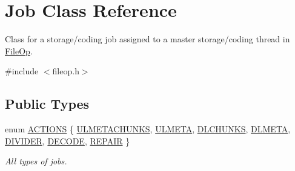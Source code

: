 \hypertarget{classJob}{\section{\-Job \-Class \-Reference}
\label{classJob}
}


\-Class for a storage/coding job assigned to a master storage/coding thread in \hyperlink{classFileOp}{\-File\-Op}.  




{\ttfamily \#include $<$fileop.\-h$>$}

\subsection*{\-Public \-Types}
\begin{DoxyCompactItemize}
\item 
enum \hyperlink{classJob_a639625a71786e5ebaee5697a4fdb6dd0}{\-A\-C\-T\-I\-O\-N\-S} \{ \*
\hyperlink{classJob_a639625a71786e5ebaee5697a4fdb6dd0a88681b55283b6d6a18dab547a5a0157e}{\-U\-L\-M\-E\-T\-A\-C\-H\-U\-N\-K\-S}, 
\hyperlink{classJob_a639625a71786e5ebaee5697a4fdb6dd0aca189975ee24cea325469a6afbd61cc7}{\-U\-L\-M\-E\-T\-A}, 
\hyperlink{classJob_a639625a71786e5ebaee5697a4fdb6dd0a7dc38d7c314a0751c433d1c4c7c0da7c}{\-D\-L\-C\-H\-U\-N\-K\-S}, 
\hyperlink{classJob_a639625a71786e5ebaee5697a4fdb6dd0a7da1798dfa76789736879d8f0edb668c}{\-D\-L\-M\-E\-T\-A}, 
\*
\hyperlink{classJob_a639625a71786e5ebaee5697a4fdb6dd0aa2a3b77b77684cff94f531cd16bce014}{\-D\-I\-V\-I\-D\-E\-R}, 
\hyperlink{classJob_a639625a71786e5ebaee5697a4fdb6dd0a5fa4d14da7528a295d2ed84cb17862a5}{\-D\-E\-C\-O\-D\-E}, 
\hyperlink{classJob_a639625a71786e5ebaee5697a4fdb6dd0a5b0318833f77886b0a10ea2b0d707c19}{\-R\-E\-P\-A\-I\-R}
 \}
\begin{DoxyCompactList}\small\item\em \-All types of jobs. \end{DoxyCompactList}\end{DoxyCompactItemize}
